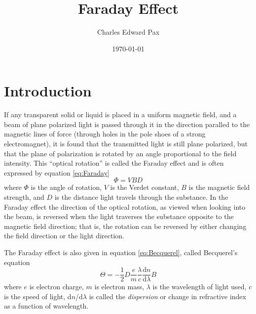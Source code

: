 \documentclass[10pt,onecolumn]{article} %
\begin{document}
\title{Faraday Effect}
\date{\today}
\author{Charles Edward Pax}

\maketitle


\section{Introduction}
If any transparent solid or liquid is placed in a uniform magnetic field, and a beam of plane polarized light is passed through it in the direction paralled to the magnetic lines of force (through holes in the pole shoes of a strong electromagnet), it is found that the transmitted light is still plane polarized, but that the plane of polarization is rotated by an angle proportional to the field intensity. This ``optical rotation'' is called the Faraday effect and is often expressed by equation \ref{eq:Faraday}\begin{equation}\label{eq:Faraday}
\Phi = V B D
\end{equation}
where $\Phi$ is the angle of rotation, $V$ is the Verdet constant, $B$ is the magnetic field strength, and $D$ is the distance light travels through the substance. In the Faraday effect the direction of the optical rotation, as viewed when looking into the beam, is reversed when the light traverses the substance opposite to the magnetic field direction; that is, the rotation can be reversed by either changing the field direction or the light direction\cite{Faraday}.

The Faraday effect is also given in equation \ref{eq:Becquerel}, called Becquerel's equation
\begin{equation}\label{eq:Becquerel}
\Theta = -\frac{1}{2} D \frac{e}{m} \frac{\lambda}{c} \frac{\mathrm{d}n}{\mathrm{d} \lambda} B
\end{equation}
where $e$ is electron charge, $m$ is electron mass, $\lambda$ is the wavelength of light used, $c$ is the speed of light, d$n$/d$\lambda$ is called the {\em dispersion} or change in refractive index as a function of wavelength.
\end{document}
